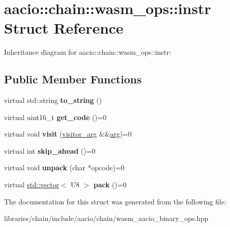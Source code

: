 \hypertarget{structaacio_1_1chain_1_1wasm__ops_1_1instr}{}\section{aacio\+:\+:chain\+:\+:wasm\+\_\+ops\+:\+:instr Struct Reference}
\label{structaacio_1_1chain_1_1wasm__ops_1_1instr}


Inheritance diagram for aacio\+:\+:chain\+:\+:wasm\+\_\+ops\+:\+:instr\+:
\subsection*{Public Member Functions}
\begin{DoxyCompactItemize}
\item 
\mbox{\label{structaacio_1_1chain_1_1wasm__ops_1_1instr_ab70fde652fe2fc042f8a6ec9ee966c3a}} 
virtual std\+::string {\bfseries to\+\_\+string} ()
\item 
\mbox{\label{structaacio_1_1chain_1_1wasm__ops_1_1instr_a2a084696ef970ba260dfab629d5662e7}} 
virtual uint16\+\_\+t {\bfseries get\+\_\+code} ()=0
\item 
\mbox{\label{structaacio_1_1chain_1_1wasm__ops_1_1instr_aa2bf1bdfd26cd77e02553e1f51188c8f}} 
virtual void {\bfseries visit} (\mbox{\hyperlink{structaacio_1_1chain_1_1wasm__ops_1_1visitor__arg}{visitor\+\_\+arg}} \&\&\mbox{\hyperlink{unionarg}{arg}})=0
\item 
\mbox{\label{structaacio_1_1chain_1_1wasm__ops_1_1instr_ae4c5a06bb2add881852fd4d83aa8d739}} 
virtual int {\bfseries skip\+\_\+ahead} ()=0
\item 
\mbox{\label{structaacio_1_1chain_1_1wasm__ops_1_1instr_aff4453bd1dc0600b5d0b3cc1053e5a83}} 
virtual void {\bfseries unpack} (char $\ast$opcode)=0
\item 
\mbox{\label{structaacio_1_1chain_1_1wasm__ops_1_1instr_a595b1ff82a5eacdf9f5c24a35ee0e54d}} 
virtual \mbox{\hyperlink{classstd_1_1vector}{std\+::vector}}$<$ U8 $>$ {\bfseries pack} ()=0
\end{DoxyCompactItemize}


The documentation for this struct was generated from the following file\+:\begin{DoxyCompactItemize}
\item 
libraries/chain/include/aacio/chain/wasm\+\_\+aacio\+\_\+binary\+\_\+ops.\+hpp\end{DoxyCompactItemize}
